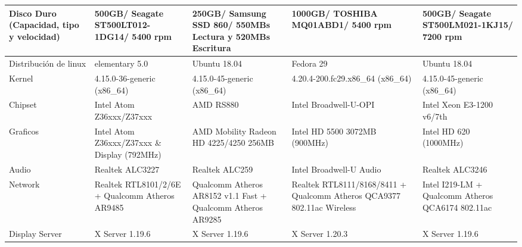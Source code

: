 \documentclass{article}
\begin{document}
\begin{table}[H]
\begin{tabularx}{\linewidth}{|L|L|L|L|L|}
Disco Duro (Capacidad, tipo y velocidad)                   & 500GB/ Seagate ST500LT012-1DG14/ 5400 rpm                         & 250GB/ Samsung SSD 860/ 550MBs Lectura y 520MBs Escritura                                       & 1000GB/ TOSHIBA MQ01ABD1/ 5400 rpm                                                & 500GB/ Seagate ST500LM021-1KJ15/ 7200 rpm                           \\ \hline
{}Distribución de linux                     & elementary 5.0                                         & Ubuntu 18.04                                                & Fedora 29                                                              & Ubuntu 18.04                                             \\ \hline
{}Kernel                 & 4.15.0-36-generic (x86\_64)                            & 4.15.0-45-generic (x86\_64)                                 & 4.20.4-200.fc29.x86\_64 (x86\_64)                                      & 4.15.0-45-generic (x86\_64)                              \\ \hline
{}Chipset                & Intel Atom Z36xxx/Z37xxx                               & AMD RS880                                                   & Intel Broadwell-U-OPI                                                  & Intel Xeon E3-1200 v6/7th                                \\ \hline
{}Graficos               & Intel Atom Z36xxx/Z37xxx \& Display (792MHz)           & AMD Mobility Radeon HD 4225/4250 256MB                      & Intel HD 5500 3072MB (900MHz)                                          & Intel HD 620 (1000MHz)                                   \\ \hline
{}Audio                  & Realtek ALC3227                                        & Realtek ALC259                                              & Intel Broadwell-U Audio                                                & Realtek ALC3246                                          \\ \hline
{}Network                & Realtek RTL8101/2/6E + Qualcomm Atheros AR9485         & Qualcomm Atheros AR8152 v1.1 Fast + Qualcomm Atheros AR9285 & Realtek RTL8111/8168/8411 + Qualcomm Atheros QCA9377 802.11ac Wireless & Intel I219-LM + Qualcomm Atheros QCA6174 802.11ac        \\ \hline
{}Display Server         & X Server 1.19.6                                        & X Server 1.19.6                                             & X Server 1.20.3                                                        & X Server 1.19.6                                          \\ \hline

\end{tabularx}
\end{table}
\end{document}
